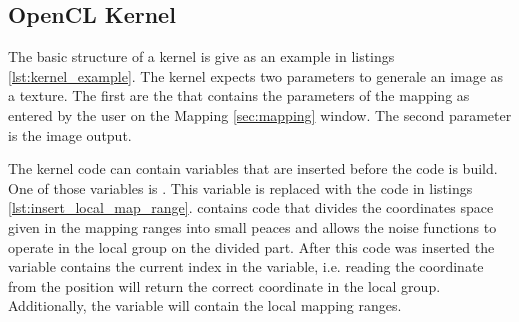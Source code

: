 %
%
%
%

\subsection{OpenCL Kernel}

The basic structure of a kernel is give as an example in listings \ref{lst:kernel_example}.
The kernel expects two parameters to generale an image as a texture. The first
are the  that contains the parameters of the mapping
as entered by the user on the Mapping \ref{sec:mapping} window. The second parameter
is the  image output.

The kernel code can contain variables that are inserted before the code is build.
One of those variables is . This variable
is replaced with the code in listings \ref{lst:insert_local_map_range}.
 contains code that divides the coordinates
space given in the mapping ranges into small peaces and allows the noise functions
to operate in the local group on the divided part. After this code was inserted 
the  variable contains the current index in the 
variable, i.e. reading the coordinate from the position  will return
the correct coordinate in the local group. Additionally, the variable
 will contain the local mapping ranges.

